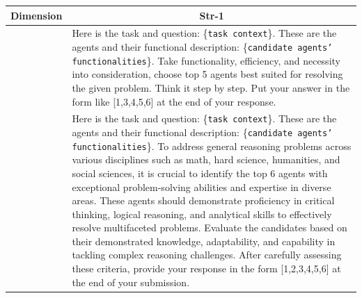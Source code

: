 \begin{table}[H]
\centering
\begin{center}

\begin{tabular}{ m{1.5cm} | m{14cm}}
\toprule
\textbf{Dimension}  & 
\multicolumn{1}{c}{Str-1} \\
 \midrule

\centering{\textbf{Default Prompt}}  & 
Here is the task and question: \{\texttt{task context}\}. \newline
These are the agents and their functional description: \{\texttt{candidate agents' functionalities}\}. \newline
\newline
Take functionality, efficiency, and necessity into consideration, choose top 5 agents best suited for resolving the given problem. Think it step by step. \newline
Put your answer in the form like [1,3,4,5,6] at the end of your response.\\
 \midrule

 \centering{\textbf{Optimized Prompt}}  & 

Here is the task and question: \{\texttt{task context}\}. \newline
These are the agents and their functional description: \{\texttt{candidate agents' functionalities}\}. \newline
\newline
To address general reasoning problems across various disciplines such as math, hard science, humanities, and social sciences, it is crucial to identify the top 6 agents with exceptional problem-solving abilities and expertise in diverse areas.  \newline
These agents should demonstrate proficiency in critical thinking, logical reasoning, and analytical skills to effectively resolve multifaceted problems.  \newline
Evaluate the candidates based on their demonstrated knowledge, adaptability, and capability in tackling complex reasoning challenges.\newline
After carefully assessing these criteria, provide your response in the form [1,2,3,4,5,6] at the end of your submission. \\ 

\bottomrule
\end{tabular}
\end{center}
\end{table}



